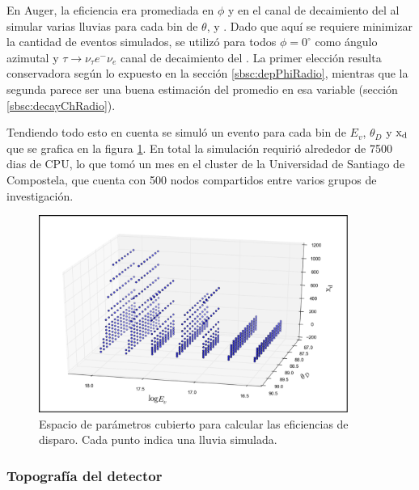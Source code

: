 	En Auger, la eficiencia era promediada en $\phi$ y en el canal de decaimiento del \tauon{} al simular varias lluvias para cada bin de $\theta$, \xd{} y \etau{}.
	Dado que aqu\'i se requiere minimizar la cantidad de eventos simulados, se utiliz\'o para todos $\phi=0^\circ$ como \'angulo azimutal y $\tau\rightarrow\nu_\tau e^-\nu_e$ canal de decaimiento del \tauon{}.
	La primer elecci\'on resulta conservadora seg\'un lo expuesto en la secci\'on \ref{sbsc:depPhiRadio}, mientras que la segunda parece ser una buena estimaci\'on del promedio en esa variable (secci\'on \ref{sbsc:decayChRadio}).
	
	Tendiendo todo esto en cuenta se simul\'o un evento para cada bin de $E_v$, $\theta_D$ y ${\rm x_d}$ que se grafica en la figura \ref{fig:binesRadio}.
	En total la simulaci\'on requiri\'o alrededor de 7500 dias de CPU, lo que tom\'o un mes en el cluster de la Universidad de Santiago de Compostela, que cuenta con 500 nodos compartidos entre varios grupos de investigaci\'on. 
	\begin{figure}[h!]
		\begin{center}
			\includegraphics[width=0.9\textwidth]{fig/resultadosRadio/binesRadio}
			\caption{\label{fig:binesRadio} Espacio de par\'ametros cubierto para calcular las eficiencias de disparo. Cada punto indica una lluvia simulada.
			}
		\end{center}
	\end{figure}
	
	\subsubsection{Topograf\'ia del detector}
	
